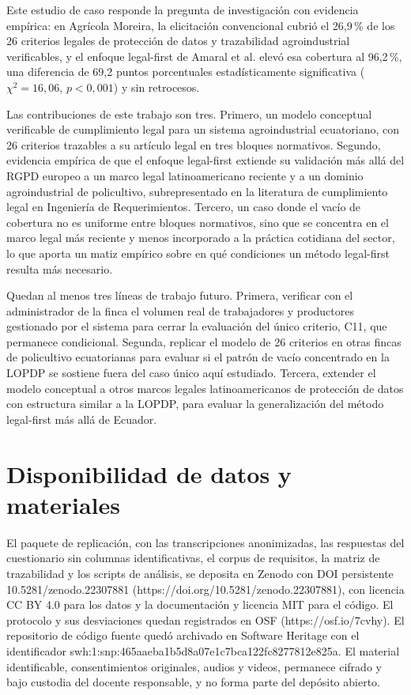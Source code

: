 \documentclass[pdflatex,sn-mathphys-num]{sn-jnl}
\begin{document}
Este estudio de caso responde la pregunta de investigaci\'on con evidencia emp\'irica: en Agr\'icola Moreira, la elicitaci\'on convencional cubri\'o el 26,9\,\% de los 26 criterios legales de protecci\'on de datos y trazabilidad agroindustrial verificables, y el enfoque legal-first de Amaral et al. \cite{amaral2021} elev\'o esa cobertura al 96,2\,\%, una diferencia de 69,2 puntos porcentuales estad\'isticamente significativa ($\chi^2=16,06$, $p<0,001$) y sin retrocesos.

Las contribuciones de este trabajo son tres. Primero, un modelo conceptual verificable de cumplimiento legal para un sistema agroindustrial ecuatoriano, con 26 criterios trazables a su art\'iculo legal en tres bloques normativos. Segundo, evidencia emp\'irica de que el enfoque legal-first extiende su validaci\'on m\'as all\'a del RGPD europeo a un marco legal latinoamericano reciente y a un dominio agroindustrial de policultivo, subrepresentado en la literatura de cumplimiento legal en Ingenier\'ia de Requerimientos. Tercero, un caso donde el vac\'io de cobertura no es uniforme entre bloques normativos, sino que se concentra en el marco legal m\'as reciente y menos incorporado a la pr\'actica cotidiana del sector, lo que aporta un matiz emp\'irico sobre en qu\'e condiciones un m\'etodo legal-first resulta m\'as necesario.

Quedan al menos tres l\'ineas de trabajo futuro. Primera, verificar con el administrador de la finca el volumen real de trabajadores y productores gestionado por el sistema para cerrar la evaluaci\'on del \'unico criterio, C11, que permanece condicional. Segunda, replicar el modelo de 26 criterios en otras fincas de policultivo ecuatorianas para evaluar si el patr\'on de vac\'io concentrado en la LOPDP se sostiene fuera del caso \'unico aqu\'i estudiado. Tercera, extender el modelo conceptual a otros marcos legales latinoamericanos de protecci\'on de datos con estructura similar a la LOPDP, para evaluar la generalizaci\'on del m\'etodo legal-first m\'as all\'a de Ecuador.

\backmatter

\section*{Disponibilidad de datos y materiales}

El paquete de replicación, con las transcripciones anonimizadas, las respuestas del cuestionario sin columnas identificativas, el corpus de requisitos, la matriz de trazabilidad y los scripts de análisis, se deposita en Zenodo con DOI persistente 10.5281/zenodo.22307881 (https://doi.org/10.5281/zenodo.22307881), con licencia CC BY 4.0 para los datos y la documentación y licencia MIT para el código. El protocolo y sus desviaciones quedan registrados en OSF (https://osf.io/7cvhy). El repositorio de código fuente quedó archivado en Software Heritage con el identificador swh:1:snp:465aaeba1b5d8a07e1c7bca122fc8277812e825a. El material identificable, consentimientos originales, audios y videos, permanece cifrado y bajo custodia del docente responsable, y no forma parte del depósito abierto.
\end{document}
